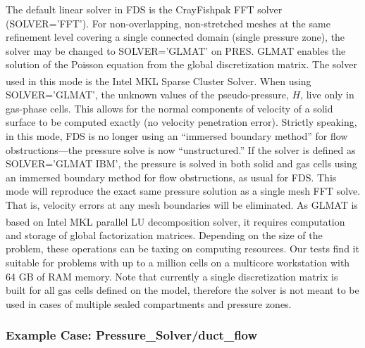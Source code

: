 \documentclass[11pt]{book}
\begin{document}
The default linear solver in FDS is the CrayFishpak FFT solver ({\ct SOLVER='FFT'}).  For non-overlapping, non-stretched meshes at the same refinement level covering a single connected domain (single pressure zone), the solver may be changed to {\ct SOLVER='GLMAT'} on {\ct PRES}. GLMAT enables the solution of the Poisson equation from the global discretization matrix. The solver used in this mode is the Intel\textsuperscript{\textregistered} MKL Sparse Cluster Solver. When using {\ct SOLVER='GLMAT'}, the unknown values of the pseudo-pressure, $H$, live only in gas-phase cells.  This allows for the normal components of velocity of a solid surface to be computed exactly (no velocity penetration error).  Strictly speaking, in this mode, FDS is no longer using an ``immersed boundary method'' for flow obstructions---the pressure solve is now ``unstructured.'' If the solver is defined as {\ct SOLVER='GLMAT IBM'}, the pressure is solved in both solid and gas cells using an immersed boundary method for flow obstructions, as usual for FDS.  This mode will reproduce the exact same pressure solution as a single mesh FFT solve.  That is, velocity errors at any mesh boundaries will be eliminated. As GLMAT is based on Intel\textsuperscript{\textregistered} MKL parallel LU decomposition solver, it requires computation and storage of global factorization matrices. Depending on the size of the problem, these operations can be taxing on computing resources. Our tests find it suitable for problems with up to a million cells on a multicore workstation with 64 GB of RAM memory. Note that currently a single discretization matrix is built for all gas cells defined on the model, therefore the solver is not meant to be used in cases of multiple sealed compartments and pressure zones.


\subsubsection{Example Case: Pressure\_Solver/duct\_flow}
\label{duct_flow}
\end{document}
